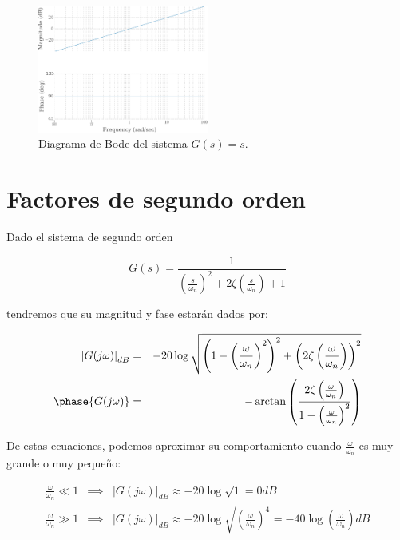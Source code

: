             \begin{figure}
                \centering
                \includegraphics[width=0.5\textwidth]{./imagenes/bodederivativo.pdf}
                \caption{\label{fig:bodederivativo}Diagrama de Bode del sistema $G(s) = s$.}
            \end{figure}

    \newpage
    \section{Factores de segundo orden}

        Dado el sistema de segundo orden

        \begin{equation*}
            G(s) = \frac{1}{\left( \frac{s}{\omega_n} \right)^2 + 2 \zeta \left( \frac{s}{\omega_n} \right) + 1}
        \end{equation*}

        tendremos que su magnitud y fase estarán dados por:

        \begin{eqnarray*}
            \left| G(j \omega) \right|_{dB} & = & -20 \log{\sqrt{\left( 1 - \left( \frac{\omega}{\omega_n} \right)^2 \right)^2 + \left( 2 \zeta \left( \frac{\omega}{\omega_n} \right) \right)^2}} \\
            \phase{G(j \omega)} & = & -\arctan{\left( \frac{2 \zeta \left( \frac{\omega}{\omega_n} \right)}{1 - \left( \frac{\omega}{\omega_n} \right)^2} \right)}
        \end{eqnarray*}

        De estas ecuaciones, podemos aproximar su comportamiento cuando $\frac{\omega}{\omega_n}$ es muy grande o muy pequeño:

        \begin{eqnarray*}
            \frac{\omega}{\omega_n} \ll 1 & \implies & \left| G(j \omega) \right|_{dB} \approx -20 \log{\sqrt{1}} = 0 dB \\
            \frac{\omega}{\omega_n} \gg 1 & \implies & \left| G(j \omega) \right|_{dB} \approx -20 \log{\sqrt{\left( \frac{\omega}{\omega_n} \right)^4}} = -40 \log{\left( \frac{\omega}{\omega_n} \right)} dB
        \end{eqnarray*}


